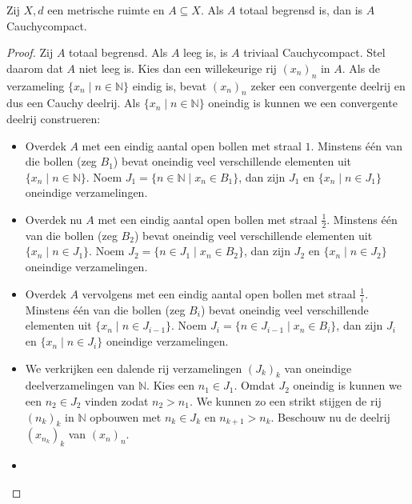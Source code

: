 \documentclass[main.tex]{subfiles}
\begin{document}
\begin{st}
  Zij $X,d$ een metrische ruimte en $A \subseteq X$.
  Als $A$ totaal begrensd is, dan is $A$ Cauchycompact.

  \begin{proof}
      Zij $A$ totaal begrensd.
      Als $A$ leeg is, is $A$ triviaal Cauchycompact.
      Stel daarom dat $A$ niet leeg is.
      Kies dan een willekeurige rij $(x_{n})_{n}$ in $A$.
      Als de verzameling $\{x_{n}\mid n\in \mathbb{N}\}$ eindig is, bevat $(x_{n})_{n}$ zeker een convergente deelrij en dus een Cauchy deelrij.
      Als $\{x_{n}\mid n\in \mathbb{N}\}$ oneindig is kunnen we een convergente deelrij construeren:
      
      \begin{itemize}
      \item 
        Overdek $A$ met een eindig aantal open bollen met straal $1$.
        Minstens \'e\'en van die bollen (zeg $B_{1}$) bevat oneindig veel verschillende elementen uit $\{x_{n}\mid n\in \mathbb{N}\}$.
        Noem $J_{1}= \{n\in \mathbb{N} \mid x_{n}\in B_{1}\}$, dan zijn $J_{1}$ en $\{x_{n}\mid n\in J_{1}\}$ oneindige verzamelingen.
      \item 
        Overdek nu $A$ met een eindig aantal open bollen met straal $\frac{1}{2}$.
        Minstens \'e\'en van die bollen (zeg $B_{2}$) bevat oneindig veel verschillende elementen uit $\{x_{n}\mid n\in J_{1}\}$.
        Noem $J_{2}= \{n\in J_{1} \mid x_{n}\in B_{2}\}$, dan zijn $J_{2}$ en $\{x_{n}\mid n\in J_{2}\}$ oneindige verzamelingen.
      \item 
        Overdek $A$ vervolgens met een eindig aantal open bollen met straal $\frac{1}{i}$.
        Minstens \'e\'en van die bollen (zeg $B_{i}$) bevat oneindig veel verschillende elementen uit $\{x_{n}\mid n\in J_{i-1}\}$.
        Noem $J_{i}= \{n\in J_{i-1} \mid x_{n}\in B_{i}\}$, dan zijn $J_{i}$ en $\{x_{n}\mid n\in J_{i}\}$ oneindige verzamelingen.
      \item 
        We verkrijken een dalende rij verzamelingen $(J_{k})_{k}$ van oneindige deelverzamelingen van $\mathbb{N}$. Kies een $n_{1}\in J_{1}$. Omdat $J_{2}$ oneindig is kunnen we een $n_{2}\in J_{2}$ vinden zodat $n_{2} > n_{1}$. We kunnen zo een strikt stijgen de rij $(n_{k})_{k}$ in $\mathbb{N}$ opbouwen met $n_{k}\in J_{k}$ en $n_{k+1} > n_{k}$.
        Beschouw nu de deelrij $(x_{n_{k}})_{k}$ van $(x_{n})_{n}$.
      \item 

\end{itemize}
\end{proof}
\end{st}
\end{document}
